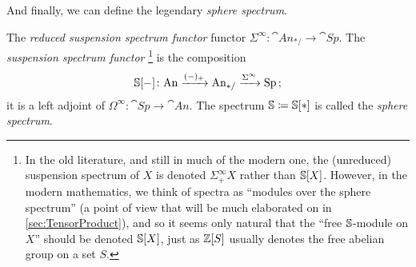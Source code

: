 And finally, we can define the legendary \emph{sphere spectrum}.
\begin{defi}\label{def:SphereSpectrum}
	The \emph{reduced suspension spectrum functor} functor $\Sigma^\infty\colon \cat{An}_{*/}\rightarrow\cat{Sp}$. The \emph{ suspension spectrum functor}%
	\footnote{In the old literature, and still in much of the modern one, the (unreduced) suspension spectrum of $X$ is denoted $\Sigma^\infty_+X$ rather than $\mathbb{S}[X]$. However, in the modern mathematics, we think of spectra as \enquote{modules over the sphere spectrum} (a point of view that will be much elaborated on in \cref{sec:TensorProduct}), and so it seems only natural that the \enquote{free $\mathbb{S}$-module on $X$} should be denoted $\mathbb{S}[X]$, just as $\mathbb{Z}[S]$ usually denotes the free abelian group on a set $S$.}
	is the composition
	\begin{equation*}
		\mathbb{S}[-]\colon \mathrm{An}\xrightarrow{(-)_+}\mathrm{An}_{*/}\xrightarrow{\Sigma^\infty} \mathrm{Sp}\,;
	\end{equation*}
	it is a left adjoint of $\Omega^\infty\colon \cat{Sp}\rightarrow \cat{An}$. The spectrum $\mathbb{S}\coloneqq \mathbb{S}[*]$ is called the \emph{sphere spectrum}.
\end{defi}
